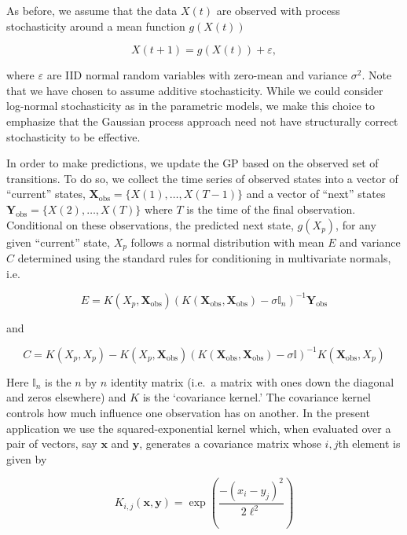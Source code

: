 \documentclass[author-year, 12pt,review]{components/elsarticle} %
\begin{document}
As before, we assume that the data $X(t)$ are observed with process
stochasticity around a mean function $g(X(t))$

\begin{equation}
X(t+1) = g(X(t)) + \varepsilon,
\end{equation}

where $\varepsilon$ are IID normal random variables with zero-mean and
variance $\sigma^2$. Note that we have chosen to assume additive
stochasticity. While we could consider log-normal stochasticity as in
the parametric models, we make this choice to emphasize that the
Gaussian process approach need not have structurally correct
stochasticity to be effective.

In order to make predictions, we update the GP based on the observed set
of transitions. To do so, we collect the time series of observed states
into a vector of ``current'' states,
$\mathbf{X}_{\textrm{obs}} = \{X(1), \dots, X(T-1)\}$ and a vector of
``next'' states $\mathbf{Y}_{\textrm{obs}} = \{X(2),\dots,X(T)\}$ where
$T$ is the time of the final observation. Conditional on these
observations, the predicted next state, $g(X_p)$, for any given
``current'' state, $X_p$ follows a normal distribution with mean $E$ and
variance $C$ determined using the standard rules for conditioning in
multivariate normals, i.e.

\begin{equation}
E = K(X_p, \mathbf{X}_{\textrm{obs}}) \left(K(\mathbf{X}_{\textrm{obs}},\mathbf{X}_{\textrm{obs}}) - \sigma \mathbb{I}_n \right)^{-1} \mathbf{Y}_{\textrm{obs}}
\end{equation}

and

\begin{equation}
C = K(X_p, X_p) - K(X_p, \mathbf{X}_{\textrm{obs}}) \left(K(\mathbf{X}_{\textrm{obs}},\mathbf{X}_{\textrm{obs}}) - \sigma \mathbb{I} \right)^{-1} K(\mathbf{X}_{\textrm{obs}}, X_p)
\end{equation}

Here $\mathbb{I}_n$ is the $n$ by $n$ identity matrix (i.e.~a matrix
with ones down the diagonal and zeros elsewhere) and $K$ is the
`covariance kernel.' The covariance kernel controls how much influence
one observation has on another. In the present application we use the
squared-exponential kernel which, when evaluated over a pair of vectors,
say $\mathbf{x}$ and $\mathbf{y}$, generates a covariance matrix whose
$i,j$th element is given by

\begin{equation}
K_{i,j}(\mathbf{x}, \mathbf{y}) = \exp\left( \frac{ -(x_i - y_j)^2}{2 \ell^2} \right)
\end{equation}
\end{document}
